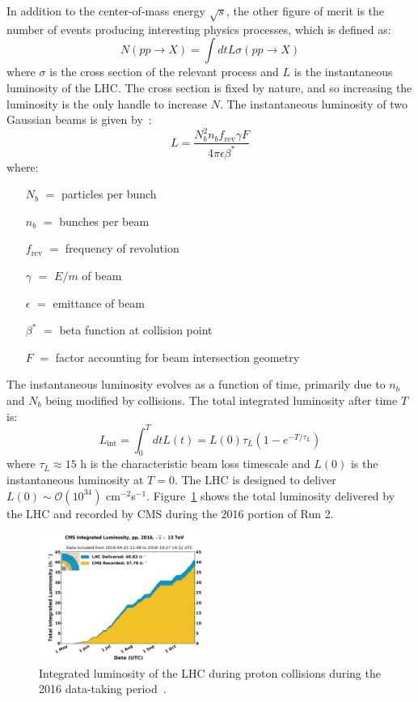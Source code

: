 In addition to the center-of-mass energy $\sqrt{s}$, the other figure of merit is the number of events producing interesting physics processes, which is defined as:
\begin{equation} 
    N(pp\rightarrow X) = \int dt L \sigma(pp\rightarrow X)
\end{equation}
where $\sigma$ is the cross section of the relevant process and $L$ is the instantaneous luminosity of the LHC. 
The cross section is fixed by nature, and so increasing the luminosity is the only handle to increase $N$. 
The instantaneous luminosity of two Gaussian beams is given by~\cite{lhcjinst}:
\begin{equation}
    L = \frac{N_b^2 n_b f_\mathrm{rev} \gamma F}{4\pi\epsilon \beta^*}
\end{equation}
where:
\begin{itemize}
    \item[$N_b$ $=$] particles per bunch
    \item[$n_b$ $=$] bunches per beam 
    \item[$f_\mathrm{rev}$ $=$] frequency of revolution 
    \item[$\gamma$ $=$] $E/m$ of beam 
    \item[$\epsilon$ $=$] emittance of beam 
    \item[$\beta^*$ $=$] beta function at collision point 
    \item[$F$ $=$] factor accounting for beam intersection geometry
\end{itemize}
The instantaneous luminosity evolves as a function of time, primarily due to $n_b$ and $N_b$ being modified by collisions.
The total integrated luminosity after time $T$ is:
\begin{equation}
    L_\mathrm{int} = \int_0^T dt L(t) = L(0) \tau_L \left(1 - e^{-T/\tau_L}\right)
\end{equation}
where $\tau_L \approx 15$ h is the characteristic beam loss timescale and $L(0)$ is the instantaneous luminosity at $T=0$.
The LHC is designed to deliver $L(0) \sim \mathcal{O}(10^{34})$ cm$^{-2}$s$^{-1}$. 
Figure~\ref{fig:cms:lumi} shows the total luminosity delivered by the LHC and recorded by CMS during the 2016 portion of Run 2. 

\begin{figure}[]
    \begin{center}
        \includegraphics[width=0.5\textwidth]{figures/cms/lumi.pdf}
        \caption{Integrated luminosity of the LHC during proton collisions during the 2016 data-taking period~\cite{lumitwiki}.}
        \label{fig:cms:lumi}
    \end{center}
\end{figure}

